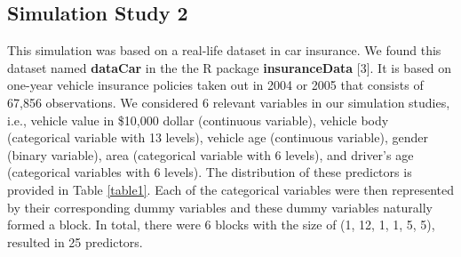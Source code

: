 \documentclass[paper=a4, fontsize=11pt]{scrartcl} %
\begin{document}
\subsection*{\textbf{Simulation Study 2}}
This simulation was based on a real-life dataset in car insurance. We found this dataset named \textbf{dataCar} in the the R package \textbf{insuranceData} [3]. It is based on one-year vehicle insurance policies taken out in 2004 or 2005 that consists of 67,856 observations. We considered 6 relevant variables in our simulation studies, i.e., vehicle value in \$10,000 dollar (continuous variable), vehicle body (categorical variable with 13 levels), vehicle age (continuous variable), gender (binary variable), area (categorical variable with 6 levels), and driver's age (categorical variables with 6 levels). The distribution of these predictors is provided in Table \ref{table1}. Each of the categorical variables were then represented by their corresponding dummy variables and these dummy variables naturally formed a block. In total, there were 6 blocks with the size of (1, 12, 1, 1, 5, 5), resulted in 25 predictors.\\
\end{document}
